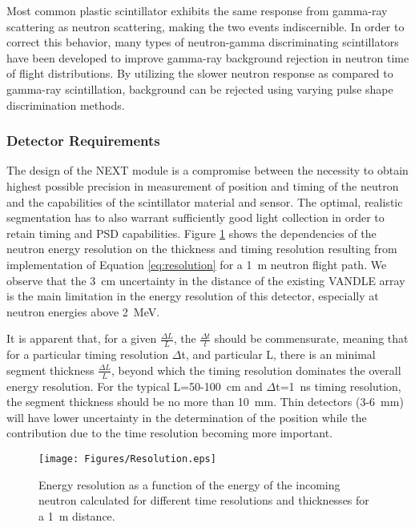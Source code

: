 \documentclass[preprint,3p,twocolumn]{elsarticle}
\begin{document}
Most common plastic scintillator exhibits the same response from gamma-ray scattering as neutron scattering, making the two events indiscernible. In order to correct this behavior, many types of neutron-gamma discriminating scintillators have been developed to improve gamma-ray background rejection in neutron time of flight distributions. By utilizing the slower neutron response as compared to gamma-ray scintillation, background can be rejected using varying pulse shape discrimination methods.

\subsubsection{Detector Requirements}

The design of the NEXT module is a compromise between the necessity to obtain highest possible precision in measurement of position and timing of the neutron and the capabilities of the scintillator material and sensor. The optimal, realistic segmentation has to also warrant sufficiently good light collection in order to retain timing and PSD capabilities. Figure \ref{fig:resolution} shows the dependencies of the  neutron energy resolution on the thickness and timing resolution resulting from implementation of Equation \ref{eq:resolution} for a 1~m neutron flight path. We observe that the 3~cm uncertainty in the distance of the existing VANDLE \cite{PETERS2016122} array is the main limitation in the energy resolution of this detector, especially at neutron energies above 2~MeV.

It is apparent that, for a given $\frac{\Delta L}{L}$, the $\frac{\Delta t}{t}$  should be commensurate, meaning that for a particular timing resolution $\Delta$t, and particular L, there is an minimal segment thickness $\frac{\Delta L}{L}$, beyond which the timing resolution dominates the overall energy resolution. For the typical L=50-100~cm and $\Delta$t=1~ns  timing resolution, the segment thickness should be no more than 10~mm. Thin detectors (3-6~mm) will have lower uncertainty in the determination of the position while the contribution due to the time resolution becoming more important.
\begin{figure}[htbp]
\centering
\texttt{[image: Figures/Resolution.eps]}
\caption{Energy resolution as a function of the energy of the incoming neutron calculated for different time resolutions and thicknesses for a 1~m distance.}
\label{fig:resolution}
\end{figure}
\end{document}

